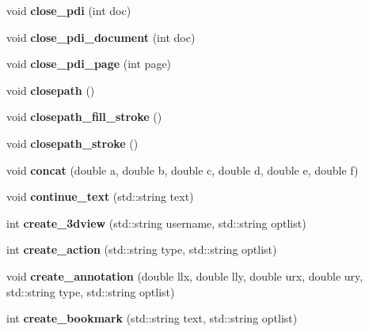\begin{DoxyCompactItemize}
void {\bfseries close\+\_\+pdi} (int doc)
\item 
\hypertarget{classPDFlib_aefcbc8ddb1ef96388f6f2c61f7e05d7e}{}\label{classPDFlib_aefcbc8ddb1ef96388f6f2c61f7e05d7e} 
void {\bfseries close\+\_\+pdi\+\_\+document} (int doc)
\item 
\hypertarget{classPDFlib_abba8fa8b8ef399bcb6d57b40bd83a5ee}{}\label{classPDFlib_abba8fa8b8ef399bcb6d57b40bd83a5ee} 
void {\bfseries close\+\_\+pdi\+\_\+page} (int page)
\item 
\hypertarget{classPDFlib_a75f331c8e3dda754cfc4acd372366917}{}\label{classPDFlib_a75f331c8e3dda754cfc4acd372366917} 
void {\bfseries closepath} ()
\item 
\hypertarget{classPDFlib_a8d3d85a5f00e71fa3127cc42ac5245a1}{}\label{classPDFlib_a8d3d85a5f00e71fa3127cc42ac5245a1} 
void {\bfseries closepath\+\_\+fill\+\_\+stroke} ()
\item 
\hypertarget{classPDFlib_a926f4d493d0625eec0a5638a1318c661}{}\label{classPDFlib_a926f4d493d0625eec0a5638a1318c661} 
void {\bfseries closepath\+\_\+stroke} ()
\item 
\hypertarget{classPDFlib_aad54672cea67b8d25f68ae735cf1f4ca}{}\label{classPDFlib_aad54672cea67b8d25f68ae735cf1f4ca} 
void {\bfseries concat} (double a, double b, double c, double d, double e, double f)
\item 
\hypertarget{classPDFlib_a4ee3d13f4de6de4dd63f2430c2fb1ee2}{}\label{classPDFlib_a4ee3d13f4de6de4dd63f2430c2fb1ee2} 
void {\bfseries continue\+\_\+text} (std\+::string text)
\item 
\hypertarget{classPDFlib_ac3fb64cece3d7fbc0b5dd760e5ce490a}{}\label{classPDFlib_ac3fb64cece3d7fbc0b5dd760e5ce490a} 
int {\bfseries create\+\_\+3dview} (std\+::string username, std\+::string optlist)
\item 
\hypertarget{classPDFlib_abd882370ecf1a79ddf66c208817ab561}{}\label{classPDFlib_abd882370ecf1a79ddf66c208817ab561} 
int {\bfseries create\+\_\+action} (std\+::string type, std\+::string optlist)
\item 
\hypertarget{classPDFlib_af75e9080056e73d1aee1ad0277ac99eb}{}\label{classPDFlib_af75e9080056e73d1aee1ad0277ac99eb} 
void {\bfseries create\+\_\+annotation} (double llx, double lly, double urx, double ury, std\+::string type, std\+::string optlist)
\item 
\hypertarget{classPDFlib_a0ad6d073c261b0b69343fbc2aec77e61}{}\label{classPDFlib_a0ad6d073c261b0b69343fbc2aec77e61} 
int {\bfseries create\+\_\+bookmark} (std\+::string text, std\+::string optlist)
\item 

\end{DoxyCompactItemize}
